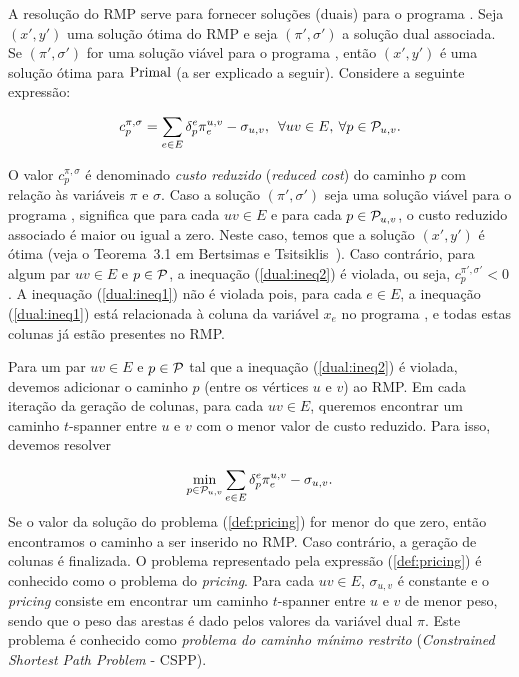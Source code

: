 A resolução do RMP serve para fornecer soluções (duais) para o
programa \FullDualPL.  Seja $(x',y')$ uma solução ótima do RMP e seja
$(\pi', \sigma')$ a solução dual associada. Se $(\pi', \sigma')$ for
uma solução viável para o programa \FullDualPL, então $(x',y')$ é uma
solução ótima para $\rm{Primal}$ (a ser explicado a seguir). Considere a
seguinte expressão:

\begin{align}
  \label{def:reduced_cost}
  c^{\pi, \sigma}_{p} = \sum_{e \in E} \delta^{e}_{p}\pi^{u,v}_{e} - \sigma_{u,v}, \:\; \forall uv \in E, \: \forall p \in \mathcal{P}_{u,v}. 
\end{align}

O valor $c^{\pi, \sigma}_{p}$ é denominado \emph{custo reduzido}
(\emph{reduced cost}) do caminho $p$ com relação às variáveis
$\pi$ e $\sigma$.
Caso a solução $(\pi', \sigma')$ seja uma solução viável para o programa \FullDualPL,
significa que para cada $uv \in E$ e para cada $p \in \mathcal{P}_{u,v}$, o custo
reduzido associado é maior ou igual a zero. Neste caso, temos que a solução $(x',y')$
é ótima (veja o Teorema~3.1 em Bertsimas e Tsitsiklis~\cite{BertsimasT1997}). Caso contrário, 
para algum par $uv \in E$ e $p \in \mathcal{P}$, a inequação (\ref{dual:ineq2})
é violada, ou seja, $c^{\pi', \sigma'}_{p} < 0$. A inequação (\ref{dual:ineq1})
não é violada pois, para cada $e \in E$, a inequação (\ref{dual:ineq1})
está relacionada à coluna da variável $x_e$ no programa 
\FullPrimalPL, e todas estas colunas já estão presentes no RMP.

Para um par $uv \in E$ e $p \in \mathcal{P}$ tal que a inequação
(\ref{dual:ineq2}) é violada, devemos adicionar o caminho $p$ (entre
os vértices $u$ e $v$) ao RMP.  Em cada iteração da geração de
colunas, para cada $uv \in E$, queremos encontrar um caminho
$t$-spanner entre $u$ e $v$ com o menor valor de custo reduzido. Para
isso, devemos resolver

\begin{align}
  \label{def:pricing}
  \min_{p \in \mathcal{P}_{u,v}}\sum_{e \in E} \delta^{e}_{p}\pi^{u,v}_{e} - \sigma_{u,v}.
\end{align}
Se o valor da solução do problema (\ref{def:pricing}) for menor do que
zero, então encontramos o caminho a ser inserido no RMP. Caso
contrário, a geração de colunas é finalizada.  O problema representado
pela expressão (\ref{def:pricing}) é conhecido como o problema do
\emph{pricing}. Para cada $uv \in E$, $\sigma_{u,v}$ é constante e o
\emph{pricing} consiste em encontrar um caminho $t$-spanner entre $u$
e $v$ de menor peso, sendo que o peso das arestas é dado pelos valores
da variável dual $\pi$. Este problema é conhecido como \emph{problema
  do caminho mínimo restrito} (\emph{Constrained Shortest Path
  Problem} - CSPP).

